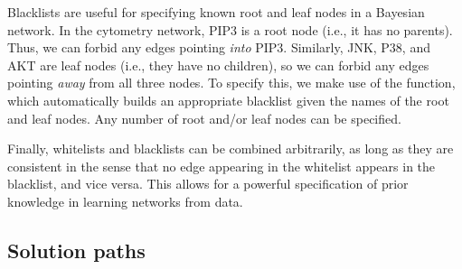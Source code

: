 \documentclass[article]{jss}
\renewcommand{\|}{\,|\,}
\begin{document}
Blacklists are useful for specifying known root and leaf nodes in a Bayesian network. In the cytometry network, PIP3 is a root node (i.e., it has no parents). Thus, we can forbid any edges pointing \emph{into} PIP3. Similarly, JNK, P38, and AKT are leaf nodes (i.e., they have no children), so we can forbid any edges pointing \emph{away} from all three nodes. To specify this, we make use of the  function, which automatically builds an appropriate blacklist given the names of the root and leaf nodes. Any number of root and/or leaf nodes can be specified.
%
\begin{CodeChunk}
\end{CodeChunk}
%
Finally, whitelists and blacklists can be combined arbitrarily, as long as they are consistent in the sense that no edge appearing in the whitelist appears in the blacklist, and vice versa. This allows for a powerful specification of prior knowledge in learning networks from data.

\subsection{Solution paths}
\end{document}
